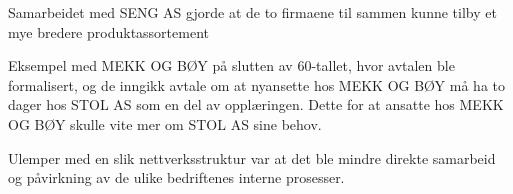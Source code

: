 Samarbeidet med SENG AS gjorde at de to firmaene til sammen kunne tilby et mye bredere produktassortement

Eksempel med MEKK OG BØY på slutten av 60-tallet, hvor avtalen ble formalisert, og de inngikk avtale om at nyansette hos MEKK OG BØY må ha to dager hos STOL AS som en del av opplæringen.
Dette for at ansatte hos MEKK OG BØY skulle vite mer om STOL AS sine behov.

Ulemper med en slik nettverksstruktur var at det ble mindre direkte samarbeid og påvirkning av de ulike bedriftenes interne prosesser.
